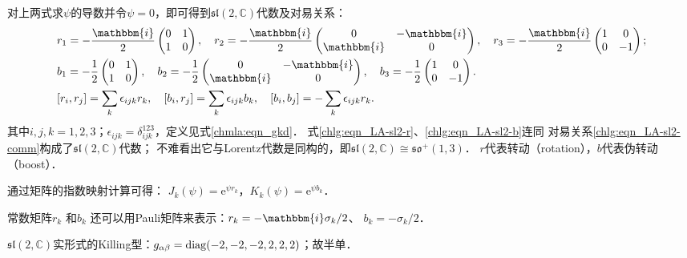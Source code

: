 对上两式求$\psi$的导数并令$\psi=0$，即可得到$\mathfrak{sl}(2,\mathbb{C})$代数及对易关系：
\begin{align}
    &r_1=-\frac{\mathbbm{i}}{2} \begin{pmatrix}  0 & 1  \\ 1 & 0  \end{pmatrix}, \quad 
     r_2=-\frac{\mathbbm{i}}{2} \begin{pmatrix}  0 & -\mathbbm{i} \\ \mathbbm{i} & 0 \end{pmatrix}, \quad
     r_3=-\frac{\mathbbm{i}}{2} \begin{pmatrix}  1 & 0 \\     0 & -1
      \end{pmatrix}; \label{chlg:eqn_LA-sl2-r} \\
    &b_1=-\frac{1}{2}\begin{pmatrix}    0 & 1 \\ 1 & 0  \end{pmatrix}, \quad
     b_2=-\frac{1}{2}\begin{pmatrix}    0 & -\mathbbm{i}  \\ \mathbbm{i}  & 0  \end{pmatrix},\quad
     b_3=-\frac{1}{2}\begin{pmatrix}    1 & 0 \\   0 & -1 
      \end{pmatrix} . \label{chlg:eqn_LA-sl2-b} \\
    &[r_i, r_j] = \sum_k \epsilon_{ijk} r_k,\quad
    [b_i, r_j] = \sum_k \epsilon_{ijk} b_k,\quad
    [b_i, b_j] = -\sum_k \epsilon_{ijk} r_k. \label{chlg:eqn_LA-sl2-comm}
\end{align}
其中$i,j,k=1,2,3$；$\epsilon_{ijk}=\delta^{123}_{ijk}$，定义见式\eqref{chmla:eqn_gkd}．
式\eqref{chlg:eqn_LA-sl2-r}、\eqref{chlg:eqn_LA-sl2-b}连同
对易关系\eqref{chlg:eqn_LA-sl2-comm}构成了$\mathfrak{sl}(2,\mathbb{C})$代数；
不难看出它与Lorentz代数是同构的，即$\mathfrak{sl}(2,\mathbb{C})\cong \mathfrak{so}^{+}(1,3)$．
$r$代表转动（rotation），$b$代表伪转动（boost）．

通过矩阵的指数映射计算可得：
$J_k(\psi)=\mathrm{e}^{\psi r_k}$，$ K_k(\psi)=\mathrm{e}^{\psi b_k}$．

常数矩阵$r_k$ 和$b_k$ 还可以用Pauli矩阵来表示：$r_k= -\mathbbm{i} \sigma_k / 2$、 $b_k=-\sigma_k / 2$．


$\mathfrak{sl}(2,\mathbb{C})$实形式的Killing型：$g_{\alpha\beta}={\rm diag}(-2,-2,-2,2,2,2)$；故半单．
%



